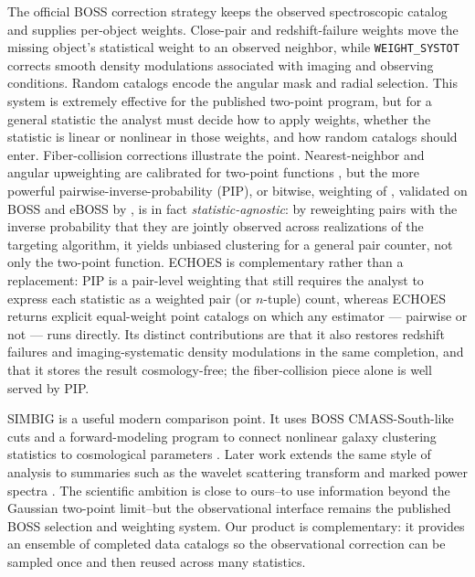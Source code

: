 \documentclass[apj]{emulateapj}
\begin{document}
The official BOSS correction strategy keeps the observed spectroscopic catalog
and supplies per-object weights.  Close-pair and redshift-failure weights move
the missing object's statistical weight to an observed neighbor, while
\texttt{WEIGHT\_SYSTOT} corrects smooth density modulations associated with
imaging and observing conditions.  Random catalogs encode the angular mask and
radial selection.  This system is extremely effective for the published
two-point program, but for a general statistic the analyst must decide how to
apply weights, whether the statistic is linear or nonlinear in those weights,
and how random catalogs should enter.
Fiber-collision corrections illustrate the point.  Nearest-neighbor and angular
upweighting are calibrated for two-point functions \citep{Guo2012}, but the more
powerful pairwise-inverse-probability (PIP), or bitwise, weighting of
\citet{BianchiPercival2017}, validated on BOSS and eBOSS by
\citet{Mohammad2020}, is in fact \emph{statistic-agnostic}: by reweighting pairs
with the inverse probability that they are jointly observed across realizations
of the targeting algorithm, it yields unbiased clustering for a general pair
counter, not only the two-point function.  ECHOES is complementary rather than a
replacement: PIP is a pair-level weighting that still requires the analyst to
express each statistic as a weighted pair (or $n$-tuple) count, whereas ECHOES
returns explicit equal-weight point catalogs on which any estimator --- pairwise
or not --- runs directly.  Its distinct contributions are that it also restores
redshift failures and imaging-systematic density modulations in the same
completion, and that it stores the result cosmology-free; the fiber-collision
piece alone is well served by PIP.

SIMBIG is a useful modern comparison point.  It uses BOSS CMASS-South-like cuts
and a forward-modeling program to connect nonlinear galaxy clustering
statistics to cosmological parameters \citep{Hahn2023Mock,Hahn2023PNAS,
Hahn2024NatAs,Hahn2024Bispectrum}.  Later work extends the same style of
analysis to summaries such as the wavelet scattering transform and marked power
spectra \citep{Regaldo2024,Massara2025SBI}.  The scientific ambition is close
to ours--to use information beyond the Gaussian two-point limit--but the
observational interface remains the published BOSS selection and weighting
system.  Our product is complementary: it provides an ensemble of completed
data catalogs so the observational correction can be sampled once and then
reused across many statistics.
\end{document}
